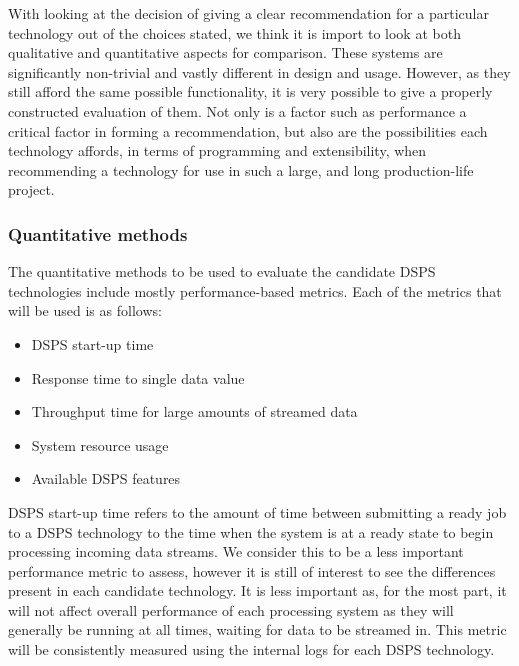 With looking at the decision of giving a clear recommendation for a particular technology out of the choices stated,
we think it is import to look at both qualitative and quantitative aspects for comparison. These systems are significantly
non-trivial and vastly different in design and usage. However, as they still afford the same possible functionality,
it is very possible to give a properly constructed evaluation of them. Not only is a factor such as performance a critical
factor in forming a recommendation, but also are the possibilities each technology affords, in terms of programming and
extensibility, when recommending a technology for use in such a large, and long production-life project.


\subsubsection{Quantitative methods} %
\label{ssub:quantitative_methods}

The quantitative methods to be used to evaluate the candidate DSPS technologies include mostly performance-based
metrics. Each of the metrics that will be used is as follows:

\begin{itemize}
  \item DSPS start-up time
  \item Response time to single data value
  \item Throughput time for large amounts of streamed data
  \item System resource usage
  \item Available DSPS features
\end{itemize}

DSPS start-up time refers to the amount of time between submitting a ready job to a DSPS technology to the time when
the system is at a ready state to begin processing incoming data streams. We consider this to be a less important performance
metric to assess, however it is still of interest to see the differences present in each candidate technology. It is less
important as, for the most part, it will not affect overall performance of each processing system as they will generally
be running at all times, waiting for data to be streamed in. This metric will be consistently measured using the internal
logs for each DSPS technology.

